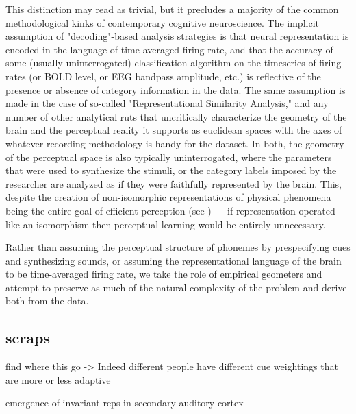 This distinction may read as trivial, but it precludes a majority of the common methodological kinks of contemporary cognitive neuroscience. The implicit assumption of "decoding"-based analysis strategies is that neural representation is encoded in the language of time-averaged firing rate, and that the accuracy of some (usually uninterrogated) classification algorithm on the timeseries of firing rates (or BOLD level, or EEG bandpass amplitude, etc.) is reflective of the presence or absence of category information in the data. The same assumption is made in the case of so-called "Representational Similarity Analysis," and any number of other analytical ruts that uncritically characterize the geometry of the brain and the perceptual reality it supports as euclidean spaces with the axes of whatever recording methodology is handy for the dataset. In both, the geometry of the perceptual space is also typically uninterrogated, where the parameters that were used to synthesize the stimuli, or the category labels imposed by the researcher are analyzed as if they were faithfully represented by the brain. This, despite the creation of non-isomorphic representations of physical phenomena being the entire goal of efficient perception (see \cite{stilpEfficientCodingStatistically2012,wangNeuralCodingStrategies2007}) --- if representation operated like an isomorphism then perceptual learning would be entirely unnecessary.

Rather than assuming the perceptual structure of phonemes by prespecifying cues and synthesizing sounds, or assuming the representational language of the brain to be time-averaged firing rate, we take the role of empirical geometers and attempt to preserve as much of the natural complexity of the problem and derive both from the data. 


\subsection{scraps}

 find where this go -> Indeed different people have different cue weightings that are more or less adaptive\cite{clayardsDifferencesCueWeights2018}

emergence of invariant reps in secondary auditory cortex\cite{carruthersEmergenceInvariantRepresentation2015c}



